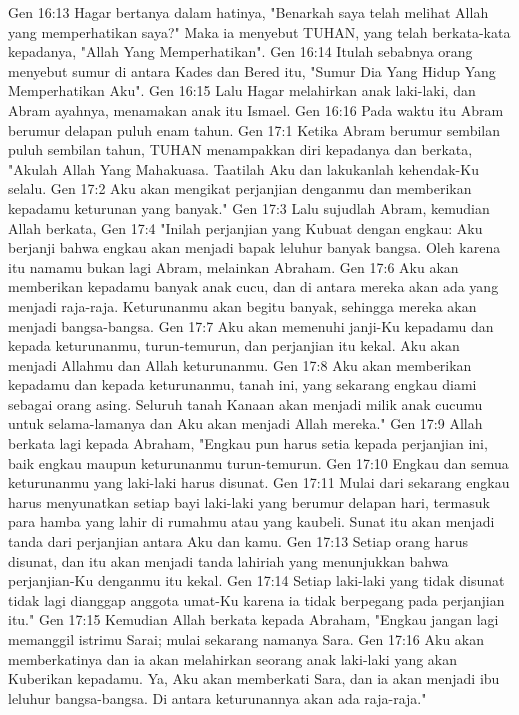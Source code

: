 Gen 16:13  Hagar bertanya dalam hatinya, "Benarkah saya telah melihat Allah yang memperhatikan saya?" Maka ia menyebut TUHAN, yang telah berkata-kata kepadanya, "Allah Yang Memperhatikan".
Gen 16:14  Itulah sebabnya orang menyebut sumur di antara Kades dan Bered itu, "Sumur Dia Yang Hidup Yang Memperhatikan Aku".
Gen 16:15  Lalu Hagar melahirkan anak laki-laki, dan Abram ayahnya, menamakan anak itu Ismael.
Gen 16:16  Pada waktu itu Abram berumur delapan puluh enam tahun.
Gen 17:1  Ketika Abram berumur sembilan puluh sembilan tahun, TUHAN menampakkan diri kepadanya dan berkata, "Akulah Allah Yang Mahakuasa. Taatilah Aku dan lakukanlah kehendak-Ku selalu.
Gen 17:2  Aku akan mengikat perjanjian denganmu dan memberikan kepadamu keturunan yang banyak."
Gen 17:3  Lalu sujudlah Abram, kemudian Allah berkata,
Gen 17:4  "Inilah perjanjian yang Kubuat dengan engkau: Aku berjanji bahwa engkau akan menjadi bapak leluhur banyak bangsa. Oleh karena itu namamu bukan lagi Abram, melainkan Abraham.
Gen 17:6  Aku akan memberikan kepadamu banyak anak cucu, dan di antara mereka akan ada yang menjadi raja-raja. Keturunanmu akan begitu banyak, sehingga mereka akan menjadi bangsa-bangsa.
Gen 17:7  Aku akan memenuhi janji-Ku kepadamu dan kepada keturunanmu, turun-temurun, dan perjanjian itu kekal. Aku akan menjadi Allahmu dan Allah keturunanmu.
Gen 17:8  Aku akan memberikan kepadamu dan kepada keturunanmu, tanah ini, yang sekarang engkau diami sebagai orang asing. Seluruh tanah Kanaan akan menjadi milik anak cucumu untuk selama-lamanya dan Aku akan menjadi Allah mereka."
Gen 17:9  Allah berkata lagi kepada Abraham, "Engkau pun harus setia kepada perjanjian ini, baik engkau maupun keturunanmu turun-temurun.
Gen 17:10  Engkau dan semua keturunanmu yang laki-laki harus disunat.
Gen 17:11  Mulai dari sekarang engkau harus menyunatkan setiap bayi laki-laki yang berumur delapan hari, termasuk para hamba yang lahir di rumahmu atau yang kaubeli. Sunat itu akan menjadi tanda dari perjanjian antara Aku dan kamu.
Gen 17:13  Setiap orang harus disunat, dan itu akan menjadi tanda lahiriah yang menunjukkan bahwa perjanjian-Ku denganmu itu kekal.
Gen 17:14  Setiap laki-laki yang tidak disunat tidak lagi dianggap anggota umat-Ku karena ia tidak berpegang pada perjanjian itu."
Gen 17:15  Kemudian Allah berkata kepada Abraham, "Engkau jangan lagi memanggil istrimu Sarai; mulai sekarang namanya Sara.
Gen 17:16  Aku akan memberkatinya dan ia akan melahirkan seorang anak laki-laki yang akan Kuberikan kepadamu. Ya, Aku akan memberkati Sara, dan ia akan menjadi ibu leluhur bangsa-bangsa. Di antara keturunannya akan ada raja-raja."
